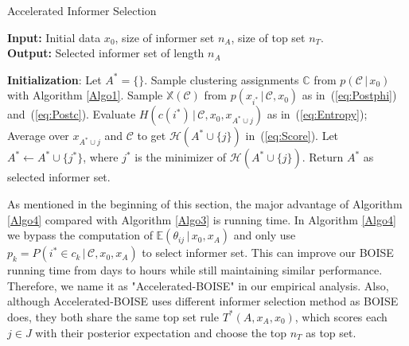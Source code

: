 \documentclass[12pt]{article}
\begin{document}
\begin{algorithm}
\caption{Accelerated Informer Selection}\label{Algo4}
\hspace*{\algorithmicindent} \textbf{Input:} Initial data $x_0$, size of informer set $n_A$, size of top set $n_T$.\\
\hspace*{\algorithmicindent} \textbf{Output:} Selected informer set of length $n_A$
\begin{algorithmic}[1]
\State \textbf{Initialization}: Let $A^* = \{\}$. Sample clustering assignments $\mathbb C$ from $p(\mathcal C\,|\, x_0)$ with Algorithm \ref{Algo1}.
    \State Sample $\mathbb{X}(\mathcal{C})$ from $p\left(x_{i^*}\,|\, \mathcal C,x_0\right)$ as in~(\ref{eq:Postphi}) and~(\ref{eq:Postc}).
\EndFor
{}
            \State Evaluate $H(c(i^*)\,|\,\mathcal{C},x_0,x_{A^*\cup j})$ as in~(\ref{eq:Entropy});
        \EndFor
        \State Average over $x_{A^*\cup j}$ and $\mathcal{C}$ to get $\mathcal H(A^*\cup\{j\} )$ in~(\ref{eq:Score}). 
    \EndFor
    \State Let $A^*\gets A^*\cup \{j^*\}$, where $j^*$ is the minimizer of $\mathcal H(A^*\cup\{j\})$.
\EndWhile
\State Return $A^*$ as selected informer set.
\end{algorithmic}
\end{algorithm}
As mentioned in the beginning of this section, the major advantage of Algorithm \ref{Algo4} compared with Algorithm \ref{Algo3} is running time. In Algorithm \ref{Algo4} we bypass the computation of $\mathbb E\left(\theta_{ij}\,|\, x_0,x_A\right)$ and only use $p_k = P(i^*\in c_k\,|\, \mathcal C,x_0,x_A)$ to select informer set. This can improve our BOISE running time from days to hours while still maintaining similar performance. Therefore, we name it as "Accelerated-BOISE" in our empirical analysis. Also, although Accelerated-BOISE uses different informer selection method as BOISE does, they both share the same top set rule $T^*(A,x_A,x_0)$, which scores each $j\in J$ with their posterior expectation and choose the top $n_T$ as top set.  
\end{document}

